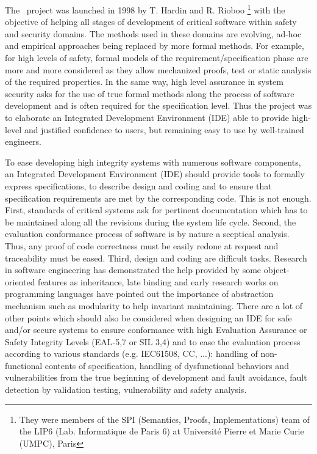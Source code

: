 


The \focal\ project was launched in 1998 by T. Hardin and R. Rioboo
\cite{HardinRiobooTSI04} \footnote{They were members of the SPI (Semantics, Proofs,
Implementations) team of the LIP6 (Lab. Informatique de Paris 6)
at Universit\'e Pierre et Marie Curie (UMPC), Paris}
 with the 
objective of helping all stages of  development of critical software
within safety and security domains. The  methods used in these domains are evolving,
ad-hoc and empirical approaches  being replaced by more formal
methods. For example, for high levels of safety, formal models of the
requirement/specification phase are more and more considered as they
allow mechanized proofs, test or static analysis of the required
properties.  In the same way, high level assurance in system security asks for
the use of true formal methods along the process of software
development and is often required for the specification level.
Thus  the project was to elaborate an Integrated
Development Environment (IDE) able to provide high-level and justified confidence to
users, but remaining easy to use by well-trained engineers.

To ease developing high integrity systems with numerous software
components, an Integrated Development Environment (IDE) should provide
tools to formally express specifications, to describe design and
coding and to ensure that specification requirements are met by the
corresponding code. This is not
enough. First, standards of critical systems ask for pertinent
documentation which has to be maintained along all the revisions
during the system life cycle. Second, the evaluation conformance
process of software is by nature a sceptical analysis. Thus, any proof
of code correctness must be easily redone at request and traceability
must be eased. Third, design
and coding are difficult tasks. Research in software engineering has
demonstrated the help provided by some object-oriented 
features as inheritance, late binding and early research works on
programming languages have pointed out the importance of abstraction
mechanism such as modularity to help invariant maintaining. There are
a lot of other points which should also be considered when designing
an IDE for safe and/or secure systems to ensure conformance with high
Evaluation Assurance or Safety Integrity Levels (EAL-5,7 or SIL 3,4)
and to ease the evaluation process according to various standards
(e.g. IEC61508, CC, ...): handling of non-functional contents of
specification, handling of dysfunctional behaviors and vulnerabilities
from the true beginning of development and fault avoidance, fault
detection by validation testing, vulnerability and safety analysis.

